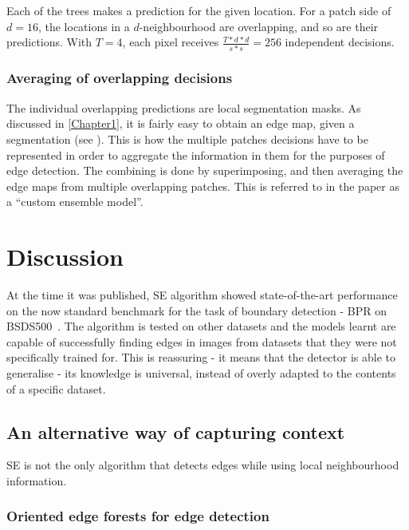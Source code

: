 Each of the trees makes a prediction for the given location. For a patch side of $d = 16$, the locations in a $d$-neighbourhood are overlapping, and so are their predictions. With $T=4$, each pixel receives $\frac{T*d*d}{s*s}=256$ independent decisions.


\subsubsection{Averaging of overlapping decisions}
The individual overlapping predictions %
are local segmentation masks. As discussed in \cref{Chapter1}, it is fairly easy to obtain an edge map, given a segmentation (see ). This is how the multiple patches decisions have to be represented in order to aggregate the information in them for the purposes of edge detection. The combining is done by superimposing, %
and then averaging the edge maps from multiple overlapping patches. %
This is referred to in the paper \cite{DollarICCV13edges} as a ``custom ensemble model''.

\section{Discussion}
At the time it was published, SE algorithm showed state-of-the-art performance on the now standard benchmark for the task of boundary detection - BPR on BSDS500~\cite{Arbelaez11}. The algorithm is tested on other datasets and the models learnt are capable of successfully finding edges in images from datasets that they were not specifically trained for. This is reassuring - it means that the detector is able to generalise - its knowledge is universal, instead of overly adapted to %
the contents of a specific dataset.

\subsection{An alternative way of capturing context}
\label{sec:ch2-alternative-capturing-context}
SE is not the only algorithm that detects edges while using local neighbourhood information.

\subsubsection{Oriented edge forests for edge detection}
